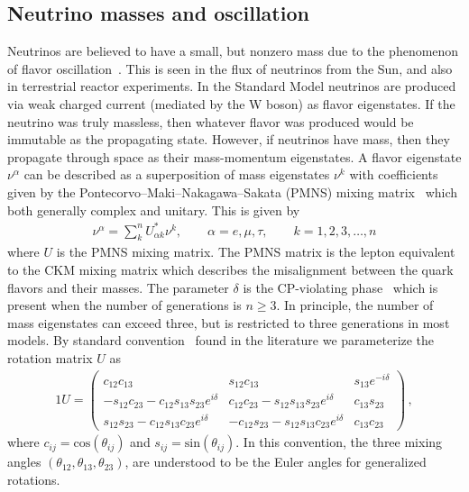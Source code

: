 \documentclass[universe,article,submit,moreauthors,pdftex,a4paper]{Definitions/mdpi}
\begin{document}
\subsection{Neutrino masses and oscillation} \label{sec:Neutrinos}
\noindent Neutrinos are believed to have a small, but nonzero mass due to the phenomenon of flavor oscillation~\cite{SuperKamiokande:1998kpq,KamLAND:2002uet,Fogli:2005cq}. This is seen in the flux of neutrinos from the Sun, and also in terrestrial reactor experiments. In the Standard Model neutrinos are produced via weak charged current (mediated by the W boson) as flavor eigenstates. If the neutrino was truly massless, then whatever flavor was produced would be immutable as the propagating state. However, if neutrinos have mass, then they propagate through space as their mass-momentum eigenstates. A flavor eigenstate $\nu^{\alpha}$ can be described as a superposition of mass eigenstates $\nu^{k}$ with coefficients given by the Pontecorvo–Maki–Nakagawa–Sakata (PMNS) mixing matrix~\cite{King:2013eh,FernandezMartinez:2016lgt} which both generally complex and unitary. This is given by
\begin{align}\label{NuFlavors}
	\nu^{\alpha}=\sum_k^nU^\ast_{\alpha k}\nu^{k}, \qquad\alpha=e,\mu,\tau,\qquad k=1,2,3,\dots,n
\end{align}
where $U$ is the PMNS mixing matrix. The PMNS matrix is the lepton equivalent to the CKM mixing matrix which describes the misalignment between the quark flavors and their masses. The parameter $\delta$ is the CP-violating phase~\cite{Pascoli:2006ci} which is present when the number of generations is $n\geq3$. In principle, the number of mass eigenstates can exceed three, but is restricted to three generations in most models. By standard convention~\cite{schwartz2014quantum} found in the literature we parameterize the rotation matrix $U$ as
	\begin{alignat}{1}
 	\label{PMNS} U =
		\begin{pmatrix}
			c_{12}c_{13} & s_{12}c_{13} & s_{13}e^{-i\delta}\\
			-s_{12}c_{23} - c_{12}s_{13}s_{23}e^{i\delta} & c_{12}c_{23} - s_{12}s_{13}s_{23}e^{i\delta} & c_{13}s_{23}\\
			s_{12}s_{23} - c_{12}s_{13}c_{23}e^{i\delta}& -c_{12}s_{23} - s_{12}s_{13}c_{23}e^{i\delta} & c_{13}c_{23}
		\end{pmatrix}\,,
	\end{alignat}
where $c_{ij} = \mathrm{cos}(\theta_{ij})$ and $s_{ij} = \mathrm{sin}(\theta_{ij})$. In this convention, the three mixing angles $(\theta_{12}, \theta_{13}, \theta_{23})$, are understood to be the Euler angles for generalized rotations.
\end{document}
